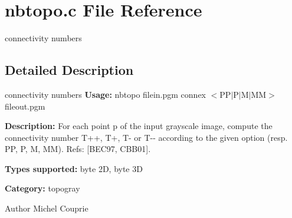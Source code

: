 \section{nbtopo.c File Reference}
\label{nbtopo_8c}


connectivity numbers  




\subsection{Detailed Description}
connectivity numbers {\bfseries Usage:} nbtopo filein.pgm connex $<$PP$|$P$|$M$|$MM$>$ fileout.pgm

{\bfseries Description:} For each point p of the input grayscale image, compute the connectivity number T++, T+, T-\/ or T-\/-\/ according to the given option (resp. PP, P, M, MM). Refs: [BEC97, CBB01].

{\bfseries Types supported:} byte 2D, byte 3D

{\bfseries Category:} topogray

\begin{DoxyAuthor}{Author}
Michel Couprie 
\end{DoxyAuthor}
